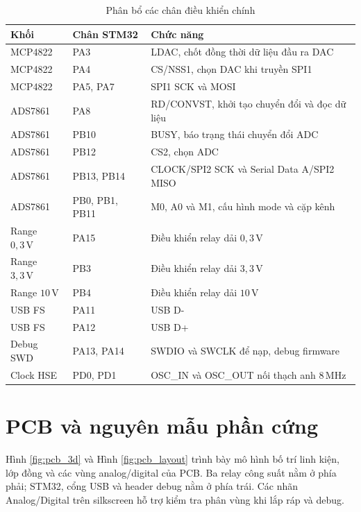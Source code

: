 \documentclass[12pt,a4paper]{report}
\newcommand{\unit}[1]{\,\mathrm{#1}}
\newcommand{\tableheadcolor}{\rowcolor{gray!18}}
\renewcommand{\arraystretch}{1.2}
\begin{document}
\begin{table}[H]
\centering
\caption{Phân bổ các chân điều khiển chính}
\label{tab:pinmap}
\renewcommand{\arraystretch}{1.42}
\begin{tabularx}{\textwidth}{|p{3cm}|p{3.8cm}|X|}
\hline
\tableheadcolor\textbf{Khối} & \textbf{Chân STM32} & \textbf{Chức năng} \\ \hline
MCP4822 & PA3 & LDAC, chốt đồng thời dữ liệu đầu ra DAC \\ \hline
MCP4822 & PA4 & CS/NSS1, chọn DAC khi truyền SPI1 \\ \hline
MCP4822 & PA5, PA7 & SPI1 SCK và MOSI \\ \hline
ADS7861 & PA8 & RD/CONVST, khởi tạo chuyển đổi và đọc dữ liệu \\ \hline
ADS7861 & PB10 & BUSY, báo trạng thái chuyển đổi ADC \\ \hline
ADS7861 & PB12 & CS2, chọn ADC \\ \hline
ADS7861 & PB13, PB14 & CLOCK/SPI2 SCK và Serial Data A/SPI2 MISO \\ \hline
ADS7861 & PB0, PB1, PB11 & M0, A0 và M1, cấu hình mode và cặp kênh \\ \hline
Range $0{,}3\unit{V}$ & PA15 & Điều khiển relay dải $0{,}3\unit{V}$ \\ \hline
Range $3{,}3\unit{V}$ & PB3 & Điều khiển relay dải $3{,}3\unit{V}$ \\ \hline
Range $10\unit{V}$ & PB4 & Điều khiển relay dải $10\unit{V}$ \\ \hline
USB FS & PA11 & USB D- \\ \hline
USB FS & PA12 & USB D+ \\ \hline
Debug SWD & PA13, PA14 & SWDIO và SWCLK để nạp, debug firmware \\ \hline
Clock HSE & PD0, PD1 & OSC\_IN và OSC\_OUT nối thạch anh $8\unit{MHz}$ \\ \hline
\end{tabularx}
\end{table}

\section{PCB và nguyên mẫu phần cứng}
Hình \ref{fig:pcb_3d} và Hình \ref{fig:pcb_layout} trình bày mô hình bố trí linh kiện, lớp đồng và các vùng analog/digital của PCB. Ba relay công suất nằm ở phía phải; STM32, cổng USB và header debug nằm ở phía trái. Các nhãn Analog/Digital trên silkscreen hỗ trợ kiểm tra phân vùng khi lắp ráp và debug.
\end{document}
